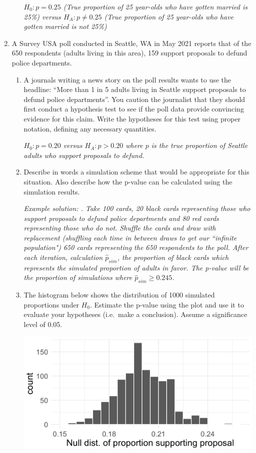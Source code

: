 \documentclass[12pt]{article}   	%
\newcommand{\soln}[2]{\textit{\textcolor{custom_red}{#2}}}{}
\begin{document}
\begin{enumerate}
\begin{enumerate}
        \soln{}{$H_{0}: p = 0.25$ (True proportion of 25 year-olds who have gotten married is 25\%) versus $H_{A}: p \neq 0.25$ (True proportion of 25 year-olds who have gotten married is not 25\%) }
        
  \end{enumerate}
\item
  A Survey USA poll conducted in Seattle, WA in May 2021 reports that of
  the 650 respondents (adults living in this area), 159 support
  proposals to defund police departments.

  \begin{enumerate}
  \item
    A journals writing a news story on the poll results wants to use the
    headline: ``More than 1 in 5 adults living in Seattle support
    proposals to defund police departments''. You caution the journalist
    that they should first conduct a hypothesis test to see if the poll
    data provide convincing evidence for this claim. Write the
    hypotheses for this test using proper notation, defining any
    necessary quantities.
    
    \soln{}{$H_{0}: p = 0.20$ versus $H_{A}: p > 0.20$ where $p$ is the true proportion of Seattle adults who support proposals to defund.}
  \item
    Describe in words a simulation scheme that would be appropriate for
    this situation. Also describe how the p-value can be calculated
    using the simulation results.
    
    \soln{}{Example solution: . Take 100 cards, 20
black cards representing those who support proposals to defund police departments
and 80 red cards representing those who do not. Shuffle the cards and draw with
replacement (shuffling each time in between draws to get our ``infinite population") 650 cards representing the 650
respondents to the poll. After each iteration, calculation $\hat{p}_{sim}$, the  proportion of black cards which represents the simulated proportion of adults in favor. The p-value will be the proportion of simulations where $\hat{p}_{sim} \geq 0.245$.}
    
  \item
    The histogram below shows the distribution of 1000 simulated
    proportions under \(H_{0}\). Estimate the p-value using the plot and
    use it to evaluate your hypotheses (i.e.~make a conclusion). Assume
    a significance level of 0.05.

    \includegraphics[scale = 0.5]{images/13-defund.png}
    

\end{enumerate}
\end{enumerate}
\end{document}
